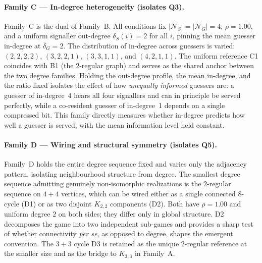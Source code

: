\documentclass[a4paper,twoside,12pt]{report}
\begin{document}
    \paragraph{Family C --- In-degree heterogeneity (isolates Q3).}
    Family~C is the dual of Family~B. All conditions fix
    $|\mathcal{N}_S| = |\mathcal{N}_G| = 4$, $\rho = 1.00$, and a uniform
    signaller out-degree $\delta_S(i) = 2$ for all $i$, pinning the mean
    guesser in-degree at $\bar{\delta}_G = 2$. The distribution of in-degree
    across guessers is varied: $(2,2,2,2)$, $(3,2,2,1)$, $(3,3,1,1)$, and
    $(4,2,1,1)$. The uniform reference C1 coincides with B1 (the $2$-regular
    graph) and serves as the shared anchor between the two degree families.
    Holding the out-degree profile, the mean in-degree, and the ratio fixed
    isolates the effect of how \emph{unequally informed} guessers are: a
    guesser of in-degree~4 hears all four signallers and can in principle be
    served perfectly, while a co-resident guesser of in-degree~1 depends on a
    single compressed bit. This family directly measures whether in-degree
    predicts how well a guesser is served, with the mean information level
    held constant.
    
    \paragraph{Family D --- Wiring and structural symmetry (isolates Q5).}
    Family~D holds the entire degree sequence fixed and varies only the
    adjacency pattern, isolating neighbourhood structure from degree. The smallest degree sequence admitting genuinely
    non-isomorphic realizations is the $2$-regular sequence on $4 + 4$
    vertices, which can be wired either as a single connected $8$-cycle (D1) or as two disjoint $K_{2,2}$ components (D2). Both have $\rho = 1.00$ and uniform degree $2$ on both sides;
    they differ only in global structure. D2 decomposes the game into two
    independent sub-games and provides a sharp test of whether connectivity
    \emph{per se}, as opposed to degree, shapes the emergent convention. The
    $3 + 3$ cycle D3 is retained as the unique $2$-regular reference
    at the smaller size and as the bridge to $K_{3,3}$ in Family~A.
    
\end{document}
